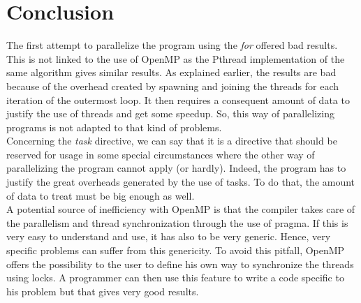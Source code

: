 \chapter{Conclusion}

The first attempt to parallelize the program using the \textit{for} offered bad results. This is not linked to the use of OpenMP as the Pthread implementation of the same algorithm gives similar results. As explained earlier, the results are bad because of the overhead created by spawning and joining the threads for each iteration of the outermost loop. It then requires a consequent amount of data to justify the use of threads and get some speedup. So, this way of parallelizing programs is not adapted to that kind of problems.\\ 

Concerning the \textit{task} directive, we can say that it is a directive that should be reserved for usage in some special circumstances where the other way of parallelizing the program cannot apply (or hardly). Indeed, the program has to justify the great overheads generated by the use of tasks. To do that, the amount of data to treat must be big enough as well.\\

A potential source of inefficiency with OpenMP is that the compiler takes care of the parallelism and thread synchronization through the use of pragma. If this is very easy to understand and use, it has also to be very generic. Hence, very specific problems can suffer from this genericity. To avoid this pitfall, OpenMP offers the possibility to the user to define his own way to synchronize the threads using locks. A programmer can then use this feature to write a code specific to his problem but that gives very good results. 
